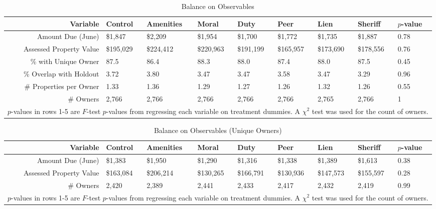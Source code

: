 \documentclass[12pt,titlepage]{article}
\begin{document}
\begin{sidewaystable}[ht]
\centering
\begin{tabular}{|r|lllllll|l|}
   \hline
Variable & Control & Amenities & Moral & Duty & Peer & Lien & Sheriff & $p$-value \\ 
   \hline
Amount Due (June) & \$1,847 & \$2,209 & \$1,954 & \$1,700 & \$1,772 & \$1,735 & \$1,887 & 0.78 \\ 
  Assessed Property Value & \$195,029 & \$224,412 & \$220,963 & \$191,199 & \$165,957 & \$173,690 & \$178,556 & 0.76 \\ 
  \% with Unique Owner & 87.5 & 86.4 & 88.3 & 88.0 & 87.4 & 88.0 & 87.5 & 0.45 \\ 
  \% Overlap with Holdout & 3.72 & 3.80 & 3.47 & 3.47 & 3.58 & 3.47 & 3.29 & 0.96 \\ 
  \# Properties per Owner & 1.33 & 1.36 & 1.29 & 1.27 & 1.26 & 1.32 & 1.26 & 0.55 \\ 
  \# Owners & 2,766 & 2,766 & 2,766 & 2,766 & 2,766 & 2,765 & 2,766 & 1 \\ 
   \hline 
 \multicolumn{9}{l}{\scriptsize{$p$-values in rows 1-5 are $F$-test $p$-values from regressing each variable on treatment dummies. A $\chi^2$ test was used for the count of owners.}} \\ 
\end{tabular}
\caption{Balance on Observables} 
\label{tbl:balance}
\end{sidewaystable}

\begin{sidewaystable}[ht]
\centering
\begin{tabular}{|r|lllllll|l|}
   \hline
Variable & Control & Amenities & Moral & Duty & Peer & Lien & Sheriff & $p$-value \\ 
   \hline
Amount Due (June) & \$1,383 & \$1,950 & \$1,290 & \$1,316 & \$1,338 & \$1,389 & \$1,613 & 0.38 \\ 
  Assessed Property Value & \$163,084 & \$206,214 & \$130,265 & \$166,791 & \$130,936 & \$147,573 & \$155,597 & 0.28 \\ 
  \# Owners & 2,420 & 2,389 & 2,441 & 2,433 & 2,417 & 2,432 & 2,419 & 0.99 \\ 
   \hline 
 \multicolumn{9}{l}{\scriptsize{$p$-values in rows 1-5 are $F$-test $p$-values from regressing each variable on treatment dummies. A $\chi^2$ test was used for the count of owners.}} \\ 
\end{tabular}
\caption{Balance on Observables (Unique Owners)} 
\label{tbl:balance_unq_own}
\end{sidewaystable}
\end{document}

